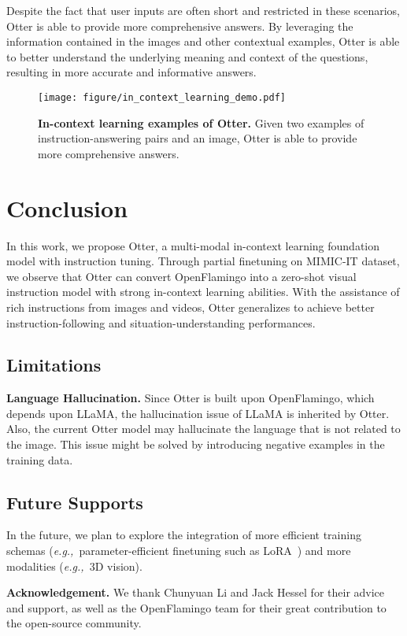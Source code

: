 \documentclass{article}
\newcommand{\eg}{\textit{e.g.,~}}
\begin{document}
Despite the fact that user inputs are often short and restricted in these scenarios, Otter is able to provide more comprehensive answers. By leveraging the information contained in the images and other contextual examples, Otter is able to better understand the underlying meaning and context of the questions, resulting in more accurate and informative answers.

\begin{figure}[htp]
    \centering
    \texttt{[image: figure/in\_context\_learning\_demo.pdf]}
    \caption{\textbf{In-context learning examples of Otter.} Given two examples of instruction-answering pairs and an image, Otter is able to provide more comprehensive answers.}
    \label{fig:in_context_learning_demo}
\end{figure}
 \section{Conclusion}
In this work, we propose Otter, a multi-modal in-context learning foundation model with instruction tuning. Through partial finetuning on MIMIC-IT dataset, we observe that Otter can convert OpenFlamingo into a zero-shot visual instruction model with strong in-context learning abilities. With the assistance of rich instructions from images and videos, Otter generalizes to achieve better instruction-following and situation-understanding performances.

\subsection{Limitations}
\textbf{Language Hallucination.} Since Otter is built upon OpenFlamingo, which depends upon LLaMA, the hallucination issue of LLaMA is inherited by Otter. Also, the current Otter model may hallucinate the language that is not related to the image. This issue might be solved by introducing negative examples in the training data.

\subsection{Future Supports}
In the future, we plan to explore the integration of more efficient training schemas (\eg parameter-efficient finetuning such as LoRA~\cite{lora}) and more modalities (\eg 3D vision).


\textbf{Acknowledgement.} We thank Chunyuan Li and Jack Hessel for their advice and support, as well as the OpenFlamingo team for their great contribution to the open-source community. \clearpage


\end{document}
